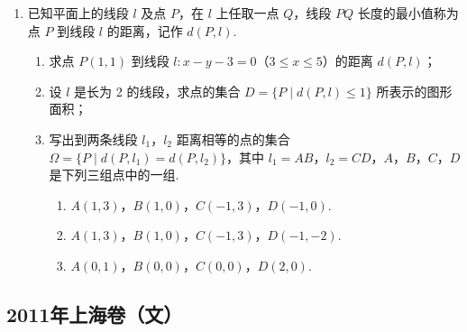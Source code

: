 \begin{description}
\begin{enumerate}[leftmargin=5pt]
\begin{enumerate}
\item 求 \(c_1\)，\(c_2\)，\(c_3\)，\(c_4\)；
\item 求证：在数列 \(\{a_n\}\) 中，但不在数列 \(\{b_n\}\) 中的项恰为 \(a_2\)，\(a_4\)，\(\cdots\)，\(a_{2n}\)，\(\cdots\)；
\item 求数列 \(\{c_n\}\) 的通项公式.
\end{enumerate}

        \item 已知平面上的线段 \(l\) 及点 \(P\)，在 \(l\) 上任取一点 \(Q\)，线段 \(PQ\) 长度的最小值称为点 \(P\) 到线段 \(l\) 的距离，记作 \(d(P, l)\).

\begin{enumerate}
\item 求点 \(P(1,1)\) 到线段 \(l: x - y - 3 = 0\)（\(3 \leqslant x \leqslant 5\)）的距离 \(d(P, l)\)；
\item 设 \(l\) 是长为 2 的线段，求点的集合 \(D = \{P \mid d(P, l) \leqslant 1\}\) 所表示的图形面积；
\item 写出到两条线段 \(l_1\)，\(l_2\) 距离相等的点的集合 \(\Omega = \{P \mid d(P, l_1) = d(P, l_2)\}\)，其中 \(l_1 = AB\)，\(l_2 = CD\)，\(A\)，\(B\)，\(C\)，\(D\) 是下列三组点中的一组.

\begin{enumerate}
\item \(A(1,3)\)，\(B(1,0)\)，\(C(-1,3)\)，\(D(-1,0)\).
\item \(A(1,3)\)，\(B(1,0)\)，\(C(-1,3)\)，\(D(-1,-2)\).
\item \(A(0,1)\)，\(B(0,0)\)，\(C(0,0)\)，\(D(2,0)\).
\end{enumerate}
\end{enumerate}

    \end{enumerate}

\end{description}


\subsection{2011年上海卷（文）}\label{gk:2011年上海卷（文）}

